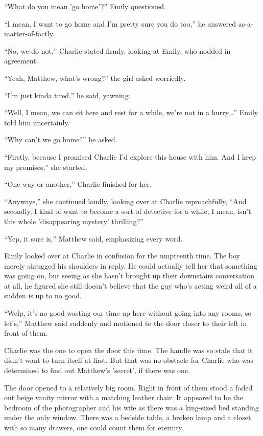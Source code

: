 “What do you mean 'go home'?” Emily questioned.

“I mean, I want to go home and I'm pretty sure you do too,” he answered as-a-matter-of-factly.

“No, we do not,” Charlie stated firmly, looking at Emily, who nodded in agreement.

“Yeah, Matthew, what's wrong?” the girl asked worriedly.

“I'm just kinda tired,” he said, yawning.

“Well, I mean, we can sit here and rest for a while, we're not in a hurry…” Emily told him uncertainly.

“Why can't we go home?” he asked.

“Firstly, because I promised Charlie I'd explore this house with him. And I keep my promises,” she started.

“One way or another,” Charlie finished for her.

“Anyways,” she continued loudly, looking over at Charlie reproachfully, “And secondly, I kind of want to become a sort of detective for a while, I mean, isn't this whole 'disappearing mystery' thrilling?”

“Yep, it sure is,” Matthew said, emphasizing every word.

Emily looked over at Charlie in confusion for the umpteenth time. The boy merely shrugged his shoulders in reply. He could actually tell her that something was going on, but seeing as she hasn't brought up their downstairs conversation at all, he figured she still doesn't believe that the guy who's acting weird all of a sudden is up to no good.

“Welp, it's no good wasting our time up here without going into any rooms, so let's,” Matthew said suddenly and motioned to the door closer to their left in front of them.

Charlie was the one to open the door this time. The handle was so stale that it didn't want to turn itself at first. But that was no obstacle for Charlie who was determined to find out Matthew's 'secret', if there was one.

The door opened to a relatively big room. Right in front of them stood a faded out beige vanity mirror with a matching leather chair. It appeared to be the bedroom of the photographer and his wife as there was a king-sized bed standing under the only window. There was a bedside table, a broken lamp and a closet with so many drawers, one could count them for eternity.

